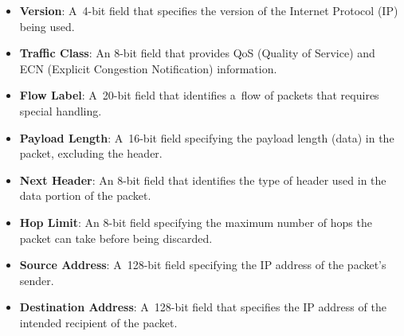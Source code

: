 \documentclass[
  printed,     %
  color,       %
  oneside,     %
  nosansbold,  %
  nocolorbold, %
  nolof,         %
  nolot,         %
]{fithesis4}
\begin{document}
\begin{itemize}[noitemsep,topsep=0pt]
    \item \textbf{Version}: A~4-bit field that specifies the version of the Internet Protocol (IP) being used.
    \item \textbf{Traffic Class}: An 8-bit field that provides QoS (Quality of Service) and ECN (Explicit Congestion Notification) information.
    \item \textbf{Flow Label}: A~20-bit field that identifies a~flow of packets that requires special handling.
    \item \textbf{Payload Length}: A~16-bit field specifying the payload length (data) in the packet, excluding the header.
    \item \textbf{Next Header}: An 8-bit field that identifies the type of header used in the data portion of the packet.
    \item \textbf{Hop Limit}: An 8-bit field specifying the maximum number of hops the packet can take before being discarded.
    \item \textbf{Source Address}: A~128-bit field specifying the IP address of the packet's sender.
    \item \textbf{Destination Address}: A~128-bit field that specifies the IP address of the intended recipient of the packet.
\end{itemize}
\end{document}
